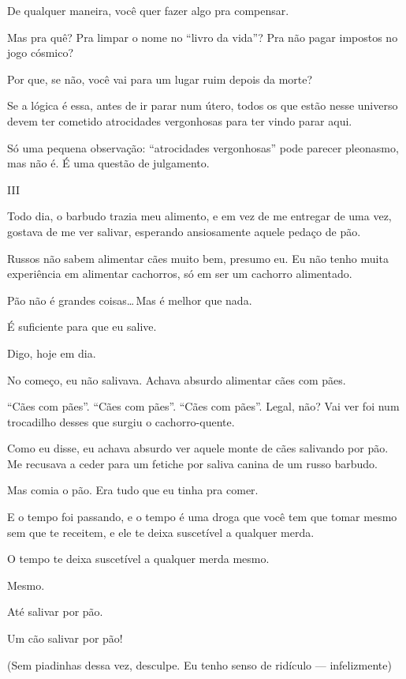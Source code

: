 De qualquer maneira, você quer fazer algo pra compensar.

Mas pra quê? Pra limpar o nome no ``livro da vida''? Pra não pagar impostos no jogo cósmico?

Por que, se não, você vai para um lugar ruim depois da morte?

Se a lógica é essa, antes de ir parar num útero, todos os que estão nesse universo devem ter cometido atrocidades vergonhosas para ter vindo parar aqui.

Só uma pequena observação: ``atrocidades vergonhosas'' pode parecer pleonasmo, mas não é. É uma questão de julgamento.

\begin{center}
{\Large III}
\end{center}

Todo dia, o barbudo trazia meu alimento, e em vez de me entregar de uma vez, gostava de me ver salivar, esperando ansiosamente aquele pedaço de pão.

\enlargethispage{\baselineskip}

Russos não sabem alimentar cães muito bem, presumo eu. Eu não tenho muita experiência em alimentar cachorros, só em ser um cachorro alimentado.

Pão não é grandes coisas\ldots\,Mas é melhor que nada.

É suficiente para que eu salive.

Digo, hoje em dia.

No começo, eu não salivava. Achava absurdo alimentar cães com pães.

``Cães com pães''. ``Cães com pães''. ``Cães com pães''. Legal, não? Vai ver foi num trocadilho desses que surgiu o ca\-chor\-ro-quen\-te.

Como eu disse, eu achava absurdo ver aquele monte de cães salivando por pão. Me recusava a ceder para um fetiche por saliva canina de um russo barbudo.

Mas comia o pão. Era tudo que eu tinha pra comer.

E o tempo foi passando, e o tempo é uma droga que você tem que tomar mesmo sem que te receitem, e ele te deixa suscetível a qualquer merda.

O tempo te deixa suscetível a qualquer merda mesmo.

Mesmo.

Até salivar por pão.

Um cão salivar por pão!

(Sem piadinhas dessa vez, desculpe. Eu tenho senso de ridículo --- infelizmente)

